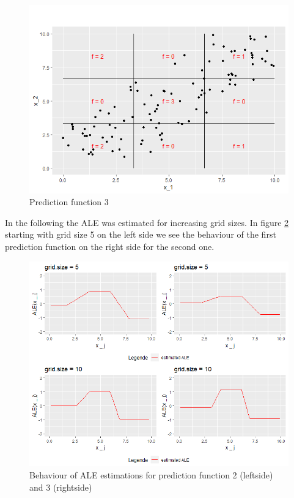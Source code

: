 \documentclass[
]{krantz}
\begin{document}
\begin{figure}
\includegraphics[width=1\linewidth]{images/ALE_2_pwc_example5_predf_2_} \caption{Prediction function 3}\label{fig:pwcexample5predf2}
\end{figure}



In the following the ALE was estimated for increasing grid sizes. In figure \ref{fig:pwcexample5gs510} starting with grid size 5 on the left side we see the behaviour of the first prediction function on the right side for the second one.

\begin{figure}
\includegraphics[width=1\linewidth]{images/ALE_2_pwc_example5_gs5_10_} \caption{Behaviour of ALE estimations for prediction function 2 (leftside) and 3 (rightside)}\label{fig:pwcexample5gs510}
\end{figure}
\end{document}
